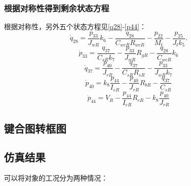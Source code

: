 \subsubsection{根据对称性得到剩余状态方程}
根据对称性，另外五个状态方程见\ref{q28}-\ref{p44}：
\begin{equation}\label{q28}
\dot{ q}  _ { 28 } = \frac { p _ { 33 } } { J _ { w R }  } k _ { 6 } - \frac { q _ { 28 } } { C _ { w cR }  R _ { w c R } } - \frac { p _ { 22 } } { M _ { t } } - \frac { p _ { 25 } } { J _ { t } k _ { 5 } }.
\end{equation}
\begin{equation}
\dot{ p } _ { 33 } = \frac { q _ { 37 } } { C _ { s R }  k _ { 7 } } - \frac { p _ { 33 } } { J _ { wR }  } R _ { gR }  - \frac { q _ { 28 } } { C _ { w cR }  } k _ { 6 }
\end{equation}
\begin{equation}
\dot{q} _ { 37 } = \frac { p _ { 40 } } { J _ { r R } } - \frac { q _ { 37 } } { C _ { sR }  R _ { sR}  } - \frac { p _ { 33 } } { J _ { w R}  k _ { 7 } }
\end{equation}
\begin{equation}
\dot{ p } _ { 40 } = k _ { 8 } \frac { p _ { 44 } } { I _ { e R}  } - \frac { p _ { 40 } } { J _ { r R }  } R _ { b R }  - \frac { q _ { 37 } } { C _ { s R } }
\end{equation}
\begin{equation}\label{p44}
\dot{ p } _ { 44 } = V _ {R}  - \frac { p _ { 44 } } { I _ { e R} } R _ { e R }  - k _ { 8 } \frac { p _ { 40 } } { J _ { r R  } }
\end{equation}
\subsection{键合图转框图}

\subsection{仿真结果}

可以将对象的工况分为两种情况：

